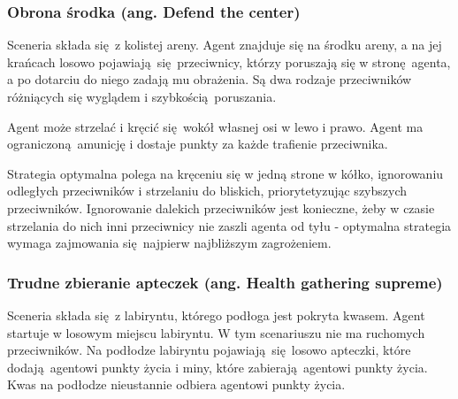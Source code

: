 \subsubsection{Obrona środka (ang. Defend the center)}\label{scenario_dtc}
Sceneria składa się z kolistej areny. Agent znajduje się na środku areny, a na jej krańcach losowo pojawiają się przeciwnicy, którzy poruszają się w stronę agenta, a po dotarciu do niego zadają mu obrażenia. Są dwa rodzaje przeciwników różniących się wyglądem i szybkością poruszania.

Agent może strzelać i kręcić się wokół własnej osi w lewo i prawo. Agent ma ograniczoną amunicję i dostaje punkty za każde trafienie przeciwnika.

Strategia optymalna polega na kręceniu się w jedną strone w kółko, ignorowaniu odległych przeciwników i strzelaniu do bliskich, priorytetyzując szybszych przeciwników. Ignorowanie dalekich przeciwników jest konieczne, żeby w czasie strzelania do nich inni przeciwnicy nie zaszli agenta od tyłu - optymalna strategia wymaga zajmowania się najpierw najbliższym zagrożeniem.

\begin{figure}[H]
	\begin{floatrow}
	\end{floatrow}
\end{figure}


\subsubsection{Trudne zbieranie apteczek (ang. Health gathering supreme) }\label{scenario_hgs}
Sceneria składa się z labiryntu, którego podłoga jest pokryta kwasem. Agent startuje w losowym miejscu labiryntu. W tym scenariuszu nie ma ruchomych przeciwników. Na podłodze labiryntu pojawiają się losowo apteczki, które dodają agentowi punkty życia i miny, które zabierają agentowi punkty życia. Kwas na podłodze nieustannie odbiera agentowi punkty życia. 

